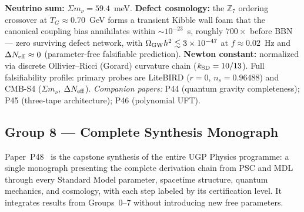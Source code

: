 \documentclass[11pt]{article}
\begin{document}
\textbf{Neutrino sum:} $\Sigma m_\nu = 59.4$~meV.
\textbf{Defect cosmology:} the $\mathbb{Z}_7$ ordering crossover at
$T_G \approx 0.70$~GeV forms a transient Kibble wall foam that the canonical
coupling bias annihilates within ${\sim}10^{-23}$~s, roughly $700\times$ before
BBN --- zero surviving defect network, with
$\Omega_{\rm GW}h^2 \lesssim 3\times10^{-47}$ at $f \approx 0.02$~Hz and
$\Delta N_{\rm eff} \approx 0$ (parameter-free falsifiable prediction).
\textbf{Newton constant:} normalized via discrete Ollivier--Ricci (Gorard) curvature
chain ($k_{\rm SD} = 10/13$).  Full falsifiability profile: primary probes are
LiteBIRD ($r = 0$, $n_s = 0.96488$) and CMB-S4 ($\Sigma m_\nu$, $\Delta N_{\rm eff}$).
\emph{Companion papers:} P44 (quantum gravity completeness); P45 (three-tape architecture); P46 (polynomial UFT).

\subsection{Group 8 — Complete Synthesis Monograph}

Paper~P48~\cite{SpivackGTECompleteFramework} is the capstone synthesis of the entire
UGP Physics programme: a single monograph presenting the complete derivation chain
from PSC and MDL through every Standard Model parameter, spacetime structure,
quantum mechanics, and cosmology, with each step labeled by its certification level.
It integrates results from Groups~0--7 without introducing new free parameters.
\end{document}
